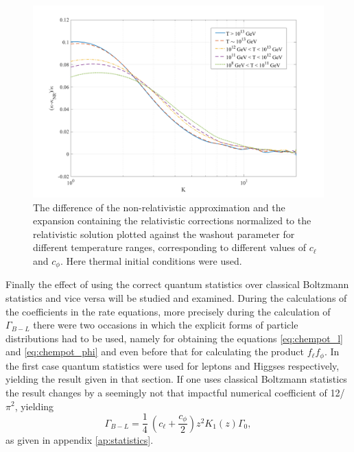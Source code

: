\begin{figure}[H]
	\centering
	\includegraphics[width=\linewidth]{Images/corrections}
	\caption{The difference of the non-relativistic approximation and the expansion containing the relativistic corrections normalized to the relativistic solution plotted against the washout parameter for different temperature ranges, corresponding to different values of $c_\ell$ and $c_\phi$. Here thermal initial conditions were used.}
	\label{fig:corrections}
\end{figure}
Finally the effect of using the correct quantum statistics over classical Boltzmann statistics and vice versa will be studied and examined. 
During the calculations of the coefficients in the rate equations, more precisely during the calculation of $\Gamma_{B-L}$ there were two occasions in which the explicit forms of particle distributions had to be used, namely for obtaining the equations \eqref{eq:chempot_l} and \eqref{eq:chempot_phi} and even before that for calculating the product $f_\ell f_\phi$. \newline \indent
In the first case quantum statistics were used for leptons and Higgses respectively, yielding the result given in that section. If one uses classical Boltzmann statistics the result changes by a seemingly not that impactful numerical coefficient of 12/$\pi^2$, yielding
\begin{equation}
\Gamma_{B-L}=\frac{1}{4}\:\left(c_\ell+\frac{c_\phi}{2}\right)z^2K_1(z)\Gamma_0,
\label{eq:Gamma_B-l_classical}
\end{equation}
as given in appendix \ref{ap:statistics}.
